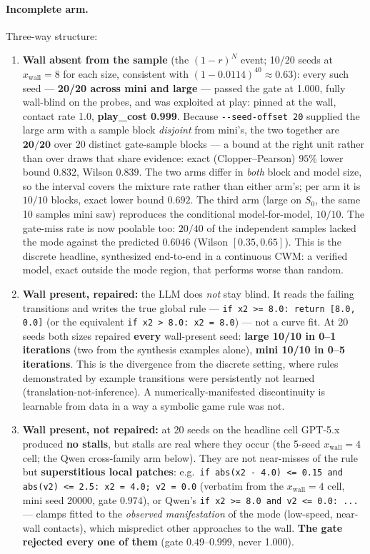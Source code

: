 \documentclass[11pt]{article}
\theoremstyle{definition}
\theoremstyle{remark}
\begin{document}
\paragraph{Incomplete arm.} Three-way structure:
\begin{enumerate}
\item \textbf{Wall absent from the sample} (the $(1-r)^N$ event; 10/20 seeds at $x_\mathrm{wall} = 8$ for each size, consistent with $(1-0.0114)^{40} \approx 0.63$): every such seed --- \textbf{20/20 across mini and large} --- passed the gate at 1.000, fully wall-blind on the probes, and was exploited at play: pinned at the wall, contact rate 1.0, \textbf{play\_cost 0.999}. Because \texttt{-{}-seed-offset 20} supplied the large arm with a sample block \emph{disjoint} from mini's, the two together are $\mathbf{20/20}$ over $20$ distinct gate-sample blocks --- a bound at the right unit rather than over draws that share evidence: exact (Clopper--Pearson) $95\%$ lower bound $\mathbf{0.832}$, Wilson $0.839$. The two arms differ in \emph{both} block and model size, so the interval covers the mixture rate rather than either arm's; per arm it is $10/10$ blocks, exact lower bound $0.692$. The third arm (large on $S_0$, the same 10 samples mini saw) reproduces the conditional model-for-model, $10/10$. The gate-miss rate is now poolable too: $20/40$ of the independent samples lacked the mode against the predicted $0.6046$ (Wilson $[0.35, 0.65]$). This is the discrete headline, synthesized end-to-end in a continuous CWM: a verified model, exact outside the mode region, that performs worse than random.
\item \textbf{Wall present, repaired:} the LLM does \emph{not} stay blind. It reads the failing transitions and writes the true global rule --- \texttt{if x2 >= 8.0: return [8.0, 0.0]} (or the equivalent \texttt{if x2 > 8.0: x2 = 8.0}) --- not a curve fit. At 20 seeds both sizes repaired \textbf{every} wall-present seed: \textbf{large 10/10 in 0--1 iterations} (two from the synthesis examples alone), \textbf{mini 10/10 in 0--5 iterations}. This is the divergence from the discrete setting, where rules demonstrated by example transitions were persistently not learned (translation-not-inference). A numerically-manifested discontinuity is learnable from data in a way a symbolic game rule was not.
\item \textbf{Wall present, not repaired:} at 20 seeds on the headline cell GPT-5.x produced \textbf{no stalls}, but stalls are real where they occur (the 5-seed $x_\mathrm{wall} = 4$ cell; the Qwen cross-family arm below). They are not near-misses of the rule but \textbf{superstitious local patches}: e.g.\ \texttt{if abs(x2 - 4.0) <= 0.15 and abs(v2) <= 2.5: x2 = 4.0; v2 = 0.0} (verbatim from the $x_\mathrm{wall} = 4$ cell, mini seed 20000, gate $0.974$), or Qwen's \texttt{if x2 >= 8.0 and v2 <= 0.0: ...} --- clamps fitted to the \emph{observed manifestation} of the mode (low-speed, near-wall contacts), which mispredict other approaches to the wall. \textbf{The gate rejected every one of them} (gate $0.49$--$0.999$, never 1.000).
\end{enumerate}
\end{document}

